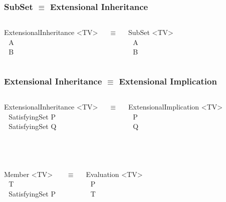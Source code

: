 \documentclass{beamer}
\begin{document}
\frame
{
  \frametitle{SubSet $\equiv$ Extensional Inheritance}

  \begin{columns}
    \column{2in}

    ExtensionalInheritance <TV>\\
    $\ \ \ $A\\
    $\ \ \ $B\\

    \column{.5in}
    
    $\equiv$
    
    \column{1.2in}
  
    SubSet <TV>\\
    $\ \ \ $A\\
    $\ \ \ $B\\
  \end{columns}
}

\frame
{
  \frametitle{Extensional Inheritance $\equiv$ Extensional
    Implication}

  \begin{columns}
    \column{2in}

    ExtensionalInheritance <TV>\\
    $\ \ \ $SatisfyingSet P\\
    $\ \ \ $SatisfyingSet Q\\

    \column{.1in}
    
    $\equiv$
    
    \column{2in}
  
    ExtensionalImplication <TV>\\
    $\ \ \ $P\\
    $\ \ \ $Q\\
  \end{columns}

  $\ $\\[1cm]
  
  \pause

  \begin{columns}
    \column{2in}

    Member <TV>\\
    $\ \ \ $T\\
    $\ \ \ $SatisfyingSet P\\

    \column{.1in}
    
    $\equiv$
    
    \column{2in}
  
    Evaluation <TV>\\
    $\ \ \ $P\\
    $\ \ \ $T\\
  \end{columns}

}
\end{document}
